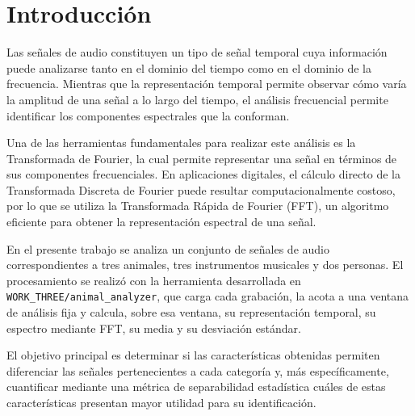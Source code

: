 
\section{Introducción}

Las señales de audio constituyen un tipo de señal temporal cuya información puede analizarse tanto en el dominio del tiempo como en el dominio de la frecuencia. Mientras que la representación temporal permite observar cómo varía la amplitud de una señal a lo largo del tiempo, el análisis frecuencial permite identificar los componentes espectrales que la conforman.

Una de las herramientas fundamentales para realizar este análisis es la Transformada de Fourier, la cual permite representar una señal en términos de sus componentes frecuenciales. En aplicaciones digitales, el cálculo directo de la Transformada Discreta de Fourier puede resultar computacionalmente costoso, por lo que se utiliza la Transformada Rápida de Fourier (FFT), un algoritmo eficiente para obtener la representación espectral de una señal.

En el presente trabajo se analiza un conjunto de señales de audio correspondientes a tres animales, tres instrumentos musicales y dos personas. El procesamiento se realizó con la herramienta desarrollada en \texttt{WORK\_THREE/animal\_analyzer}, que carga cada grabación, la acota a una ventana de análisis fija y calcula, sobre esa ventana, su representación temporal, su espectro mediante FFT, su media y su desviación estándar.

El objetivo principal es determinar si las características obtenidas permiten diferenciar las señales pertenecientes a cada categoría y, más específicamente, cuantificar mediante una métrica de separabilidad estadística cuáles de estas características presentan mayor utilidad para su identificación.
